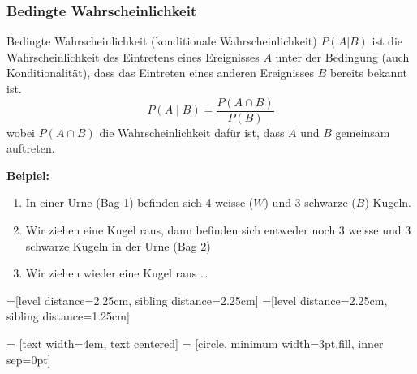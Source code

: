 \subsubsection{Bedingte Wahrscheinlichkeit}
Bedingte Wahrscheinlichkeit (konditionale Wahrscheinlichkeit) $P(A|B)$ ist die Wahrscheinlichkeit des Eintretens eines Ereignisses $A$ unter der Bedingung (auch Konditionalität), dass das Eintreten eines anderen Ereignisses  $B$ bereits bekannt ist.
\begin{equation*}
	P(A\mid B) = \frac{P(A\cap B)}{P(B)}
\end{equation*}
wobei $P(A\cap B)$ die Wahrscheinlichkeit dafür ist, dass $A$ und $B$ gemeinsam auftreten.

\textbf{Beipiel:} 
\begin{enumerate}\itemsep0em
	\item In einer Urne (Bag 1) befinden sich 4 weisse ($W$) und 3 schwarze ($B$) Kugeln.
	\item Wir ziehen eine Kugel raus, dann befinden sich entweder noch 3 weisse und 3 schwarze Kugeln in der Urne (Bag 2)
	\item Wir ziehen wieder eine Kugel raus \dots
\end{enumerate}

=[level distance=2.25cm, sibling distance=2.25cm]
=[level distance=2.25cm, sibling distance=1.25cm]

 = [text width=4em, text centered]
 = [circle, minimum width=3pt,fill, inner sep=0pt]

